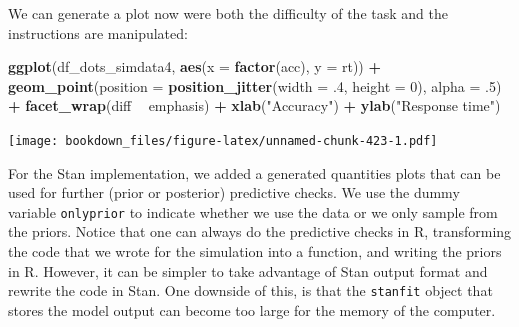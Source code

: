 \documentclass[12pt,]{krantz}
\newenvironment{Shaded}{\begin{snugshade}}{\end{snugshade}}
\newcommand{\KeywordTok}[1]{\textcolor[rgb]{0.13,0.29,0.53}{\textbf{#1}}}
\newcommand{\DataTypeTok}[1]{\textcolor[rgb]{0.13,0.29,0.53}{#1}}
\newcommand{\DecValTok}[1]{\textcolor[rgb]{0.00,0.00,0.81}{#1}}
\newcommand{\FloatTok}[1]{\textcolor[rgb]{0.00,0.00,0.81}{#1}}
\newcommand{\StringTok}[1]{\textcolor[rgb]{0.31,0.60,0.02}{#1}}
\newcommand{\OperatorTok}[1]{\textcolor[rgb]{0.81,0.36,0.00}{\textbf{#1}}}
\newcommand{\NormalTok}[1]{#1}
\theoremstyle{definition}
\theoremstyle{definition}
\theoremstyle{definition}
\theoremstyle{remark}
\begin{document}
We can generate a plot now were both the difficulty of the task and the
instructions are manipulated:

\begin{Shaded}
\begin{Highlighting}[]
\KeywordTok{ggplot}\NormalTok{(df_dots_simdata4, }\KeywordTok{aes}\NormalTok{(}\DataTypeTok{x =} \KeywordTok{factor}\NormalTok{(acc), }\DataTypeTok{y =}\NormalTok{ rt)) }\OperatorTok{+}
\StringTok{  }\KeywordTok{geom_point}\NormalTok{(}\DataTypeTok{position =} \KeywordTok{position_jitter}\NormalTok{(}\DataTypeTok{width =} \FloatTok{.4}\NormalTok{, }\DataTypeTok{height =} \DecValTok{0}\NormalTok{),}
             \DataTypeTok{alpha =} \FloatTok{.5}\NormalTok{) }\OperatorTok{+}
\StringTok{  }\KeywordTok{facet_wrap}\NormalTok{(diff }\OperatorTok{~}\StringTok{ }\NormalTok{emphasis) }\OperatorTok{+}
\StringTok{  }\KeywordTok{xlab}\NormalTok{(}\StringTok{"Accuracy"}\NormalTok{) }\OperatorTok{+}
\StringTok{  }\KeywordTok{ylab}\NormalTok{(}\StringTok{"Response time"}\NormalTok{)}
\end{Highlighting}
\end{Shaded}

\texttt{[image: bookdown\_files/figure-latex/unnamed-chunk-423-1.pdf]}

For the Stan implementation, we added a generated quantities plots that
can be used for further (prior or posterior) predictive checks. We use
the dummy variable \texttt{onlyprior} to indicate whether we use the
data or we only sample from the priors. Notice that one can always do
the predictive checks in R, transforming the code that we wrote for the
simulation into a function, and writing the priors in R. However, it can
be simpler to take advantage of Stan output format and rewrite the code
in Stan. One downside of this, is that the \texttt{stanfit} object that
stores the model output can become too large for the memory of the
computer.
\end{document}
